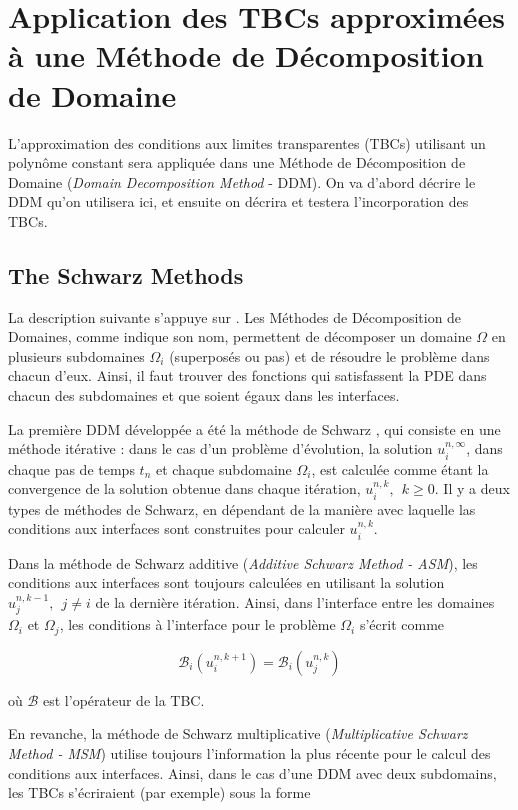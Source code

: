 \section{Application des TBCs approximées à une Méthode de Décomposition de Domaine}

\indent L'approximation des conditions aux limites transparentes (TBCs) utilisant un polynôme constant sera appliquée dans une Méthode de Décomposition de Domaine (\emph{Domain Decomposition Method} - DDM). On va d'abord décrire le DDM qu'on utilisera ici, et ensuite on décrira et testera l'incorporation des TBCs.

\subsection{The Schwarz Methods}

\indent La description suivante s'appuye sur \cite{Japhet2003}. Les Méthodes de Décomposition de Domaines, comme indique son nom, permettent de décomposer un domaine $\Omega$ en plusieurs subdomaines $\Omega_i$ (superposés ou pas) et de résoudre le problème dans chacun d'eux. Ainsi, il faut trouver des fonctions qui satisfassent la PDE dans chacun des subdomaines et que soient égaux dans les interfaces.

\indent La première DDM développée a été la méthode de Schwarz \cite{Japhet2003,Gander2008}, qui consiste en une méthode itérative : dans le cas d'un problème d'évolution, la solution $u_i^{n,\infty}$, dans chaque pas de temps $t_n$ et chaque subdomaine $\Omega_i$, est calculée comme étant la convergence de la solution obtenue dans chaque itération, $u_i^{n,k}, \ \ k\geq 0$. Il y a deux types de méthodes de Schwarz, en dépendant de la manière avec laquelle las conditions aux interfaces sont construites pour calculer $u_i^{n,k}$.

\indent Dans la méthode de Schwarz additive (\emph{Additive Schwarz Method - ASM}), les conditions aux interfaces sont toujours calculées en utilisant la solution $u_j^{n,k-1}, \ \ j \neq i$ de la dernière itération. Ainsi, dans l'interface entre les domaines $\Omega_i$ et $\Omega_j$, les conditions à l'interface pour le problème $\Omega_i$ s'écrit comme

$$\mathcal{B}_i(u_i^{n,k+1}) = \mathcal{B}_i(u_j^{n,k})$$

\noindent où $\mathcal{B}$ est l'opérateur de la TBC.

\indent En revanche, la méthode de Schwarz multiplicative (\emph{Multiplicative Schwarz Method - MSM}) utilise toujours l'information la plus récente pour le calcul des conditions aux interfaces. Ainsi, dans le cas d'une DDM avec deux subdomains, les TBCs s'écriraient (par exemple) sous la forme

